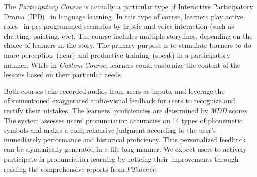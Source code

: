 \documentclass[sigconf]{acmart}
\begin{document}
The \textit{Participatory Course} is actually a particular type of Interactive Participatory Drama (IPD)~\cite{hubbard2002interactive} in language learning. In this type of course, learners play active roles~\cite{bu2018icoobook} in pre-programmed scenarios by haptic and voice interaction (such as chatting, painting, etc). The course includes multiple storylines, depending on the choice of learners in the story.
The primary purpose is to stimulate learners to do more perception~(hear) and productive training~(speak) in a participatory manner.
While in \textit{Custom Course}, learners could customize the content of the lessons based on their particular needs.
%

Both courses take recorded audios from users as inputs, and leverage the aforementioned exaggerated audio-visual feedback for users to recognize and rectify their mistakes. The learners' proficiencies are determined by \textit{MDD} scores. The system assesses users’ pronunciation accuracies on 14 types of phonemetic symbols and makes a comprehensive judgment according to the user's immediately performance and historical proficiency. Thus personalized feedback can be dynamically generated in a life-long manner. 
%
We expect users to actively participate in pronunciation learning by noticing their improvements through reading the comprehensive reports from \textit{PTeacher}. 
\end{document}
